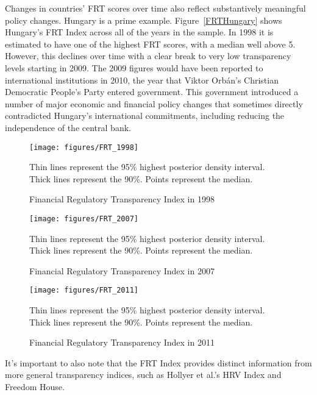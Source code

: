 \documentclass[a4paper]{article}
\begin{document}
{Changes in countries' FRT scores over time also reflect substantively meaningful policy changes. Hungary is a prime example. Figure~\ref{FRTHungary} shows Hungary's FRT Index across all of the years in the sample. In 1998 it is estimated to have one of the highest FRT scores, with a median well above 5. However, this declines over time with a clear break to very low transparency levels starting in 2009. The 2009 figures would have been reported to international institutions in 2010, the year that Viktor Orb\'{a}n's Christian Democratic People's Party entered government. This government introduced a number of major economic and financial policy changes that sometimes directly contradicted Hungary's international commitments, including reducing the independence of the central bank. 

\begin{figure}
    \caption{Financial Regulatory Transparency Index in 1998}
    \label{FRT_1998}
    \begin{center}
        \texttt{[image: figures/FRT\_1998]}
    \end{center}
    {\scriptsize{Thin lines represent the 95\% highest posterior density interval. Thick lines represent the 90\%. Points represent the median.}}
\end{figure}

\begin{figure}
    \caption{Financial Regulatory Transparency Index in 2007}
    \label{FRT_2007}
    \begin{center}
        \texttt{[image: figures/FRT\_2007]}
    \end{center}
    {\scriptsize{Thin lines represent the 95\% highest posterior density interval. Thick lines represent the 90\%. Points represent the median.}}
\end{figure}

\begin{figure}
    \caption{Financial Regulatory Transparency Index in 2011}
    \label{FRT_2011}
    \begin{center}
        \texttt{[image: figures/FRT\_2011]}
    \end{center}
    {\scriptsize{Thin lines represent the 95\% highest posterior density interval. Thick lines represent the 90\%. Points represent the median.}}
\end{figure}

It's important to also note that the FRT Index provides distinct information from more general transparency indices, such as Hollyer et al.'s HRV Index and Freedom House. 

}
\end{document}
